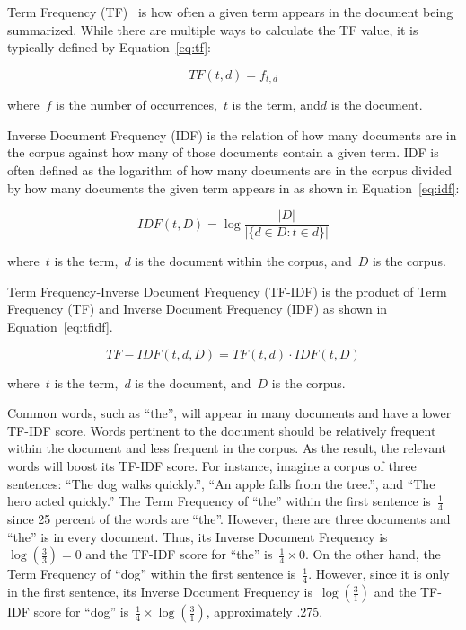 \documentclass{article}[10]
\begin{document}
Term Frequency (TF)~\cite{Leskovec} is how often a given term appears in the
document being summarized. While there are multiple ways to calculate the TF
value, it is typically defined by Equation~\eqref{eq:tf}:

\begin{equation}
  TF(t, d) = f_{t, d} \label{eq:tf}
\end{equation}

where~\(f\) is the number of occurrences,~\(t\) is the term, and\(d\) is the
document.

Inverse Document Frequency (IDF) is the relation of how many documents are in
the corpus against how many of those documents contain a given term. IDF is
often defined as the logarithm of how many documents are in the corpus divided
by how many documents the given term appears in as shown in
Equation~\eqref{eq:idf}:

\begin{equation}
  IDF(t, D) = \log\frac{|D|}{|\{d \in D : t \in d\}|} \label{eq:idf}
\end{equation}

where~\(t\) is the term,~\(d\) is the document within the corpus, and~\(D\) is
the corpus.

Term Frequency-Inverse Document Frequency (TF-IDF) is the product of Term
Frequency (TF) and Inverse Document Frequency (IDF) as shown in
Equation~\eqref{eq:tfidf}.

\begin{equation}
  TF-IDF(t, d, D) = TF(t, d) \cdot IDF(t, D) \label{eq:tfidf}
\end{equation}

where~\(t\) is the term,~\(d\) is the document, and~\(D\) is the corpus.

Common words, such as ``the'', will appear in many documents and have a lower
TF-IDF score. Words pertinent to the document should be relatively frequent
within the document and less frequent in the corpus. As the result, the relevant
words will boost its TF-IDF score. For instance, imagine a corpus of three
sentences: ``The dog walks quickly.'', ``An apple falls from the tree.'', and
``The hero acted quickly.'' The Term Frequency of ``the'' within the first
sentence is~\(\frac{1}{4}\) since 25 percent of the words are ``the''. However,
there are three documents and ``the'' is in every document. Thus, its Inverse
Document Frequency is~\( \log(\frac{3}{3}) = 0 \) and the TF-IDF score for
``the'' is~\(\frac{1}{4} \times 0\). On the other hand, the Term Frequency of
``dog'' within the first sentence is~\(\frac{1}{4}\). However, since it is only
in the first sentence, its Inverse Document Frequency is~\(\log(\frac{3}{1})\)
and the TF-IDF score for ``dog'' is~\(\frac{1}{4} \times \log(\frac{3}{1})\),
approximately .275.
\end{document}
